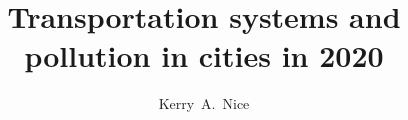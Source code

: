\documentclass[preprint,12pt]{elsarticle}
\begin{document}
\begin{frontmatter}



\title{Transportation systems and pollution in cities in 2020}


\author[melb]{Kerry~A.~Nice}
\address[melb]{Transport, Health, and Urban Design Research Lab, Faculty of Architecture, Building, and Planning, University of Melbourne, VIC, Australia.}






\end{frontmatter}
\end{document}
